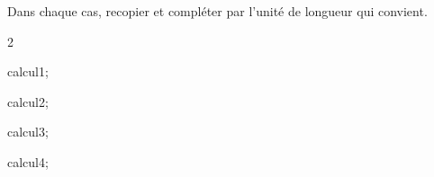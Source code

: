 \documentclass[exercice]{thedocument}%
\begin{document}
%
\noindent\vskip2pt
Dans chaque cas, recopier et compléter par l'unité de longueur qui convient.
\begin{enumerate}
    \begin{multicols}{2}
        \item \<calcul1;
        \item \<calcul2;
        \columnbreak
        \item \<calcul3;
        \item \<calcul4;
    \end{multicols}
\end{enumerate}
\end{document}
